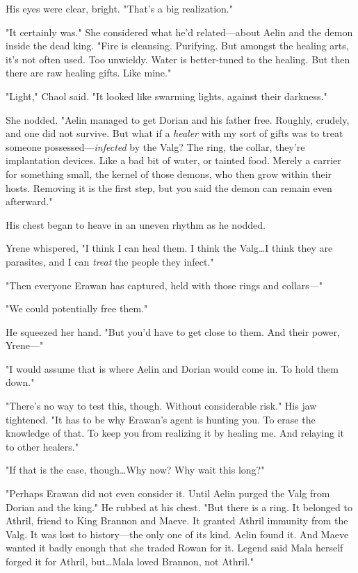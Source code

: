His eyes were clear, bright.
"That's a big realization."

"It certainly was."
She considered what he'd related---about Aelin and the demon inside the dead king.
"Fire is cleansing.
Purifying.
But amongst the healing arts, it's not often used.
Too unwieldy.
Water is better-tuned to the healing.
But then there are raw healing gifts.
Like mine."

"Light," Chaol said.
"It looked like swarming lights, against their darkness."

She nodded.
"Aelin managed to get Dorian and his father free.
Roughly, crudely, and one did not survive.
But what if a \emph{healer} with my sort of gifts was to treat someone possessed---\emph{infected} by the Valg?
The ring, the collar, they're implantation devices.
Like a bad bit of water, or tainted food.
Merely a carrier for something small, the kernel of those demons, who then grow within their hosts.
Removing it is the first step, but you said the demon can remain even afterward."

His chest began to heave in an uneven rhythm as he nodded.

Yrene whispered, "I think I can heal them.
I think the Valg\ldots I think they are parasites, and I can \emph{treat} the people they infect."

"Then everyone Erawan has captured, held with those rings and collars---"

"We could potentially free them."

He squeezed her hand.
"But you'd have to get close to them.
And their power, Yrene---"

"I would assume that is where Aelin and Dorian would come in.
To hold them down."

"There's no way to test this, though.
Without considerable risk."
His jaw tightened.
"It has to be why Erawan's agent is hunting you.
To erase the knowledge of that.
To keep you from realizing it by healing me.
And relaying it to other healers."

"If that is the case, though\ldots Why now?
Why wait this long?"

"Perhaps Erawan did not even consider it.
Until Aelin purged the Valg from Dorian and the king."
He rubbed at his chest.
"But there is a ring.
It belonged to Athril, friend to King Brannon and Maeve.
It granted Athril immunity from the Valg.
It was lost to history---the only one of its kind.
Aelin found it.
And Maeve wanted it badly enough that she traded Rowan for it.
Legend said Mala herself forged it for Athril, but\ldots Mala loved Brannon, not Athril."

